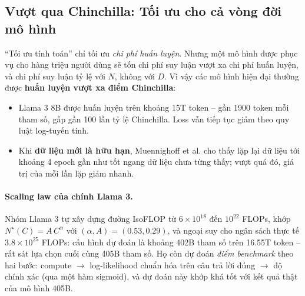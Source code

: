 \begin{center}
\label{fig:chinchilla_isoflop}
\end{center}

\subsection{Vượt qua Chinchilla: Tối ưu cho cả vòng đời mô hình}
\label{ssec:beyond_chinchilla}
“Tối ưu tính toán” chỉ tối ưu \emph{chi phí huấn luyện}. Nhưng một mô hình được phục vụ cho hàng triệu người dùng sẽ tốn chi phí suy luận vượt xa chi phí huấn luyện, và chi phí suy luận tỷ lệ với $N$, không với $D$. Vì vậy các mô hình hiện đại thường được \textbf{huấn luyện vượt xa điểm Chinchilla}:
\begin{itemize}
	\item Llama 3 8B được huấn luyện trên khoảng 15T token -- gần 1900 token mỗi tham số, gấp gần 100 lần tỷ lệ Chinchilla. Loss vẫn tiếp tục giảm theo quy luật log-tuyến tính.
	\item Khi \textbf{dữ liệu mới là hữu hạn}, Muennighoff et al. \cite{muennighoff2023scaling} cho thấy lặp lại dữ liệu tới khoảng 4 epoch gần như tốt ngang dữ liệu chưa từng thấy; vượt quá đó, giá trị của mỗi lần lặp giảm nhanh.
\end{itemize}

\paragraph{Scaling law của chính Llama 3.} Nhóm Llama 3 \cite{grattafiori2024llama3} tự xây dựng đường IsoFLOP từ $6\times10^{18}$ đến $10^{22}$ FLOPs, khớp $N^\star(C) = A\,C^{\alpha}$ với $(\alpha, A) = (0.53, 0.29)$, và ngoại suy cho ngân sách thực tế $3.8 \times 10^{25}$ FLOPs: cấu hình dự đoán là khoảng 402B tham số trên 16.55T token -- rất sát lựa chọn cuối cùng 405B tham số. Họ còn dự đoán \emph{điểm benchmark} theo hai bước: compute $\rightarrow$ log-likelihood chuẩn hóa trên câu trả lời đúng $\rightarrow$ độ chính xác (qua một hàm sigmoid), và dự đoán này khớp khá tốt với kết quả thật của mô hình 405B.

